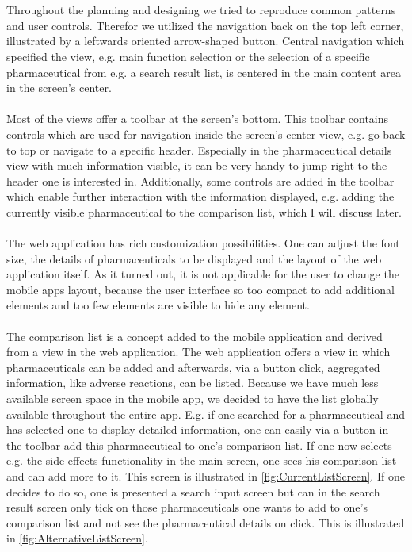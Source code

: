 \\
\\
Throughout the planning and designing we tried to reproduce common patterns and user controls. Therefor we utilized the navigation back on the top left corner, illustrated by a leftwards oriented arrow-shaped button. Central navigation which specified the view, e.g. main function selection or the selection of a specific pharmaceutical from e.g. a search result list, is centered in the main content area in the screen's center.
\\
\\
Most of the views offer a toolbar at the screen's bottom. This toolbar contains controls which are used for navigation inside the screen's center view, e.g. go back to top or navigate to a specific header. Especially in the pharmaceutical details view with much information visible, it can be very handy to jump right to the header one is interested in. Additionally, some controls are added in the toolbar which enable further interaction with the information displayed, e.g. adding the currently visible pharmaceutical to the comparison list, which I will discuss later.
\\
\\
The web application has rich customization possibilities. One can adjust the font size, the details of pharmaceuticals to be displayed and the layout of the web application itself. As it turned out, it is not applicable for the user to change the mobile apps layout, because the user interface so too compact to add additional elements and too few elements are visible to hide any element.
\\
\\
The comparison list is a concept added to the mobile application and derived from a view in the web application. The web application offers a view in which pharmaceuticals can be added and afterwards, via a button click, aggregated information, like adverse reactions, can be listed. Because we have much less available screen space in the mobile app, we decided to have the list globally available throughout the entire app. E.g. if one searched for a pharmaceutical and has selected one to display detailed information, one can easily via a button in the toolbar add this pharmaceutical to one's comparison list. If one now selects e.g. the side effects functionality in the main screen, one sees his comparison list and can add more to it. This screen is illustrated in \ref{fig:CurrentListScreen}. If one decides to do so, one is presented a search input screen but can in the search result screen only tick on those pharmaceuticals one wants to add to one's comparison list and not see the pharmaceutical details on click. This is illustrated in \ref{fig:AlternativeListScreen}.
